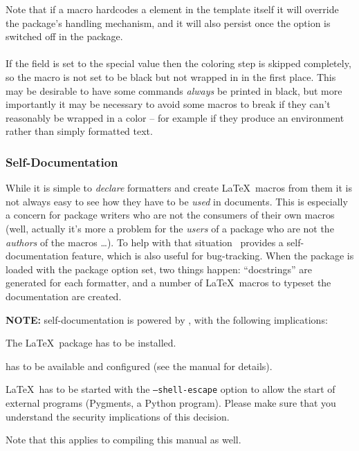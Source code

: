 \documentclass[12pt]{scrartcl}
\begin{document}
Note that if a macro hardcodes a  element in the template itself
it will override the package's handling mechanism, and it will also persist once
the  option is switched off in the package.


\paragraph{}

If the  field is set to the special value  then
the coloring step is skipped completely, so the macro is not set to be black but
not wrapped in  in the first place.  This may be desirable to
have some commands \emph{always} be printed in black, but more importantly it
may be necessary to avoid some macros to break if they can't reasonably be
wrapped in a color -- for example if they produce an environment rather than
simply formatted text.


\subsubsection{Self-Documentation}
\label{sec:self-documentation}

While it is simple to \emph{declare} formatters and create \LaTeX\ macros from
them it is not always easy to see how they have to be \emph{used} in documents.
This is especially a concern for package writers who are not the consumers of
their own macros (well, actually it's more a problem for the \emph{users} of a
package who are not the \emph{authors} of the macros \dots).  To help with that
situation \luaformatters\ provides a self-documentation feature, which is
also useful for bug-tracking. When the package is loaded with the
 package option set, two things happen: “docstrings”
are generated for each formatter, and a number of \LaTeX\ macros to typeset the
documentation are created.

\medskip

\noindent \textbf{NOTE:} self-documentation is powered by , with
the following implications:

\begin{itemize*}
	\item The  \LaTeX\ package has to be installed.
	\item {} has to be available and configured (see the  manual for details).
	\item \LaTeX\ has to be started with the \texttt{--shell-escape} option to
	allow the start of external programs (Pygments, a Python program).  Please make
	sure that you understand the security implications of this decision.
	\item Note that this applies to compiling this manual as well.
\end{itemize*}
\end{document}
